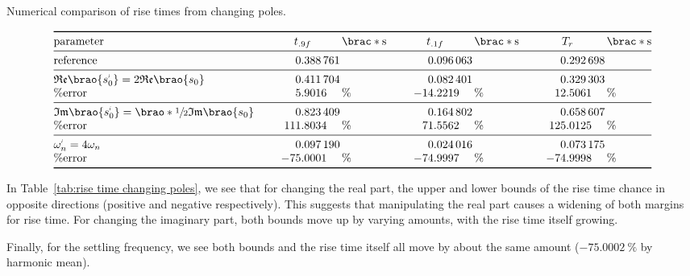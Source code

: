 \documentclass[12pt]{article}
\DeclarePairedDelimiter\brao()%
\DeclarePairedDelimiter\brac[]%
\newcommand{\setprime}[2][1]{%
    {#2}^{%
        \raisebox{1pt}{%
            \scalebox{0.5}{%
                \itshape\sffamily\uppercase%
                \expandafter{%
                    \romannumeral#1%
                }%
            }%
        }
    }%
}%
\begin{document}
\begin{table}[]
    \centering
    \caption{Numerical comparison of rise times from changing poles.}
    \[
        \begin{array}{@{}>$l<$*3{S@{\,}l}@{}}
        \toprule
            \text{parameter}
                & t_{.9f} & \brac*{\si\second}
                & t_{.1f} & \brac*{\si\second}
                & T_r & \brac*{\si\second}
        \\*
        \midrule
            \text{reference}
            & 0.388761 &
            & 0.096063 &
            & 0.292698
        \\*
        \midrule
            $\mathfrak{Re}\brao{\setprime{s}_0} = 2\mathfrak{Re}\brao{s_0}$
            & 0.411704 &
            & 0.082401 &
            & 0.329303
        \\*
            \%error
            & +5.9016 & \si\percent
            & -14.2219 & \si\percent
            & +12.5061 & \si\percent
        \\*
        \midrule
            $\mathfrak{Im}\brao{\setprime{s}_0} = \brao*{\sfrac12}\mathfrak{Im}\brao{s_0}$
            & 0.823409 &
            & 0.164802 &
            & 0.658607
        \\*
            \%error
            & +111.8034 & \si\percent
            & +71.5562 & \si\percent
            & +125.0125 & \si\percent
        \\*
        \midrule
            $\setprime\omega_n = 4\omega_n$
            & 0.097190 &
            & 0.024016 &
            & 0.073175
        \\*
            \%error
            & -75.0001 & \si\percent
            & -74.9997 & \si\percent
            & -74.9998 & \si\percent
        \\*
        \bottomrule
        \end{array}
    \]
    \label{tab:rise time changing poles}
\end{table}

In Table~\ref{tab:rise time changing poles}, we see that for changing the real part, the upper and lower bounds of the rise time chance in opposite directions (positive and negative respectively). This suggests that manipulating the real part causes a widening of both margins for rise time. For changing the imaginary part, both bounds move up by varying amounts, with the rise time itself growing.

Finally, for the settling frequency, we see both bounds and the rise time itself all move by about the same amount ($\SI{-75.0002}\percent$ by harmonic mean).
\end{document}
